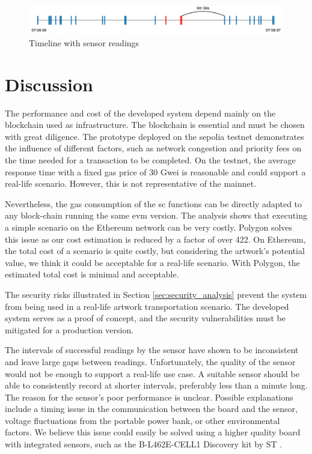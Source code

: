 \begin{figure}[ht]
    \centering
    \includegraphics[width=\textwidth]{diagrams/sensor_eval.drawio.pdf}
    \caption{Timeline with sensor readings}
    \label{fig:field_test_sensor_readings}
\end{figure}


\section{Discussion}
\label{sec:eval_discussion}
The performance and cost of the developed system depend mainly on the blockchain used as infrastructure. The blockchain is essential and must be chosen with great diligence. The prototype deployed on the sepolia testnet demonstrates the influence of different factors, such as network congestion and priority fees on the time needed for a transaction to be completed. On the testnet, the average response time with a fixed gas price of 30 Gwei is reasonable and could support a real-life scenario. However, this is not representative of the mainnet.

Nevertheless, the gas consumption of the \gls{sc} functions can be directly adapted to any block-chain running the same \gls{evm} version. The analysis shows that executing a simple scenario on the Ethereum network can be very costly. Polygon solves this issue as our cost estimation is reduced by a factor of over 422. On Ethereum, the total cost of a scenario is quite costly, but considering the artwork's potential value, we think it could be acceptable for a real-life scenario. With Polygon, the estimated total cost is minimal and acceptable.

The security risks illustrated in Section \ref{sec:security_analysis} prevent the system from being used in a real-life artwork transportation scenario. The developed system serves as a proof of concept, and the security vulnerabilities must be mitigated for a production version.

The intervals of successful readings by the sensor have shown to be inconsistent and leave large gaps between readings. Unfortunately, the quality of the sensor would not be enough to support a real-life use case. A suitable sensor should be able to consistently record at shorter intervals, preferably less than a minute long. The reason for the sensor's poor performance is unclear. Possible explanations include a timing issue in the communication between the board and the sensor, voltage fluctuations from the portable power bank, or other environmental factors. We believe this issue could easily be solved using a higher quality board with integrated sensors, such as the B-L462E-CELL1 Discovery kit by ST \cite{stmdevice}. 

